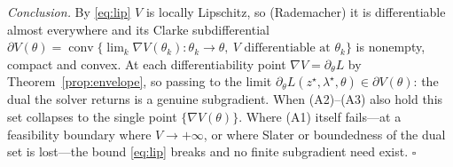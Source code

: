 \documentclass[twocolumn,amsthm]{autart}
\begin{document}
\emph{Conclusion.} By \eqref{eq:lip} $V$ is locally Lipschitz, so (Rademacher) it is
differentiable almost everywhere and its Clarke subdifferential
$\partial V(\theta)=\operatorname{conv}\{\lim_k\nabla V(\theta_k):\theta_k\to\theta,\ V
\text{ differentiable at }\theta_k\}$ is nonempty, compact and convex. At each
differentiability point $\nabla V=\partial_\theta L$ by Theorem~\ref{prop:envelope}, so
passing to the limit $\partial_\theta L(z^\star,\lambda^\star,\theta)\in\partial
V(\theta)$: the dual the solver returns is a genuine subgradient. When (A2)--(A3) also
hold this set collapses to the single point $\{\nabla V(\theta)\}$. Where (A1) itself
fails---at a feasibility boundary where $V\to+\infty$, or where Slater or boundedness of
the dual set is lost---the bound \eqref{eq:lip} breaks and no finite subgradient need
exist. \hfill$\square$




%
%
\end{document}
